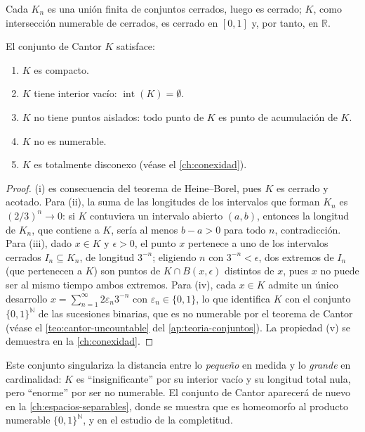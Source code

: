 Cada $K_n$ es una unión finita de conjuntos cerrados, luego es cerrado; $K$, como intersección numerable de cerrados, es cerrado en $[0,1]$ y, por tanto, en $\mathbb{R}$.

\begin{proposition}
\label{prop:propiedades-cantor}
El conjunto de Cantor $K$ satisface:
\begin{enumerate}
  \item[(i)] $K$ es compacto.
  \item[(ii)] $K$ tiene interior vacío: $\operatorname{int}(K)=\emptyset$.
  \item[(iii)] $K$ no tiene puntos aislados: todo punto de $K$ es punto de acumulación de $K$.
  \item[(iv)] $K$ no es numerable.
  \item[(v)] $K$ es totalmente disconexo (véase el \cref{ch:conexidad}).
\end{enumerate}
\end{proposition}
\begin{proof}
(i) es consecuencia del teorema de Heine--Borel, pues $K$ es cerrado y acotado. Para (ii), la suma de las longitudes de los intervalos que forman $K_n$ es $(2/3)^n\to 0$: si $K$ contuviera un intervalo abierto $(a,b)$, entonces la longitud de $K_n$, que contiene a $K$, sería al menos $b-a>0$ para todo $n$, contradicción. Para (iii), dado $x\in K$ y $\epsilon>0$, el punto $x$ pertenece a uno de los intervalos cerrados $I_n\subseteq K_n$, de longitud $3^{-n}$; eligiendo $n$ con $3^{-n}<\epsilon$, dos extremos de $I_n$ (que pertenecen a $K$) son puntos de $K\cap B(x,\epsilon)$ distintos de $x$, pues $x$ no puede ser al mismo tiempo ambos extremos. Para (iv), cada $x\in K$ admite un único desarrollo $x=\sum_{n=1}^{\infty}2\varepsilon_n3^{-n}$ con $\varepsilon_n\in\{0,1\}$, lo que identifica $K$ con el conjunto $\{0,1\}^{\mathbb{N}}$ de las sucesiones binarias, que es no numerable por el teorema de Cantor (véase el \cref{teo:cantor-uncountable} del \cref{ap:teoria-conjuntos}). La propiedad (v) se demuestra en la \cref{ch:conexidad}.
\end{proof}

Este conjunto singulariza la distancia entre lo \emph{pequeño} en medida y lo \emph{grande} en cardinalidad: $K$ es ``insignificante'' por su interior vacío y su longitud total nula, pero ``enorme'' por ser no numerable. El conjunto de Cantor aparecerá de nuevo en la \cref{ch:espacios-separables}, donde se muestra que es homeomorfo al producto numerable $\{0,1\}^{\mathbb{N}}$, y en el estudio de la completitud.